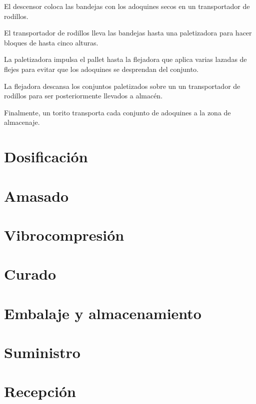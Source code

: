 El descensor coloca las bandejas con los adoquines secos en un transportador de rodillos.

El transportador de rodillos lleva las bandejas hasta una paletizadora para hacer bloques de hasta cinco alturas.

La paletizadora impulsa el pallet hasta la flejadora que aplica varias lazadas de flejes para evitar que los adoquines se desprendan del conjunto.

La flejadora descansa los conjuntos paletizados sobre un un transportador de rodillos para ser posteriormente llevados a almacén.

Finalmente, un torito transporta cada conjunto de adoquines a la zona de almacenaje.


\section{Dosificación}
\section{Amasado}
\section{Vibrocompresión}
\section{Curado}
\section{Embalaje y almacenamiento}
\section{Suministro}
\section{Recepción}
